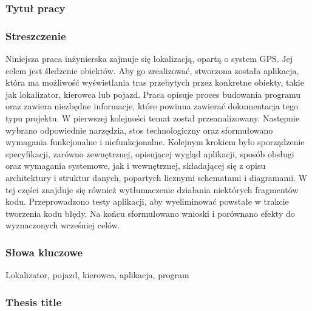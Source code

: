 \subsubsection*{Tytuł pracy} 
\Title

\subsubsection*{Streszczenie} 
Niniejsza praca inżynierska zajmuje się lokalizacją, opartą o system GPS. Jej celem jest śledzenie obiektów. Aby go zrealizować, stworzona została aplikacja, która ma możliwość wyświetlania tras przebytych przez konkretne obiekty, takie jak lokalizator, kierowca lub pojazd. Praca opisuje proces budowania programu oraz zawiera niezbędne informacje, które powinna zawierać dokumentacja tego typu projektu. W pierwszej kolejności temat został przeanalizowany. Następnie wybrano odpowiednie narzędzia, stos technologiczny oraz sformułowano wymagania funkcjonalne i niefunkcjonalne. Kolejnym krokiem było sporządzenie specyfikacji, zarówno zewnętrznej, opisującej wygląd aplikacji, sposób obsługi oraz wymagania systemowe, jak i wewnętrznej, składającej się z opisu architektury i struktur danych, popartych licznymi schematami i diagramami. W tej części znajduje się również wytłumaczenie działania niektórych fragmentów kodu. Przeprowadzono testy aplikacji, aby wyeliminować powstałe w trakcie tworzenia kodu błędy. Na końcu sformułowano wnioski i porównano efekty do wyznaczonych wcześniej celów. 

\subsubsection*{Słowa kluczowe} 
Lokalizator, pojazd, kierowca, aplikacja, program

\subsubsection*{Thesis title} 
\begin{otherlanguage}{british}
\TitleAlt
\end{otherlanguage}

